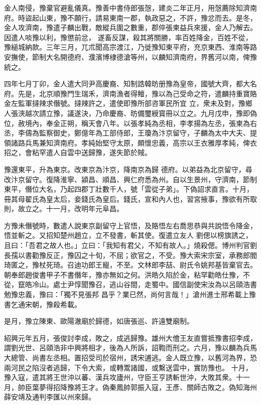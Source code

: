 \begin{pinyinscope}
 金人南侵，豫棄官避亂儀真。豫善中書侍郎張愨，建炎二年正月，用愨薦除知濟南府。時盜起山東，豫不願行，請易東南一郡，執政惡之，不許，豫忿而去。是冬，金人攻濟南，豫遣子麟出戰，敵縱兵圍之數重，郡倅張柬益兵來援，金人乃解去。因遣人啖豫以利，豫懲前忿，
 遂畜反謀，殺其將關勝，率百姓降金，百姓不從，豫縋城納款。三年三月，兀朮聞高宗渡江，乃徙豫知東平府，充京東西、淮南等路安撫使，節制大名開德府、濮濱博棣德滄等州，以麟知濟南府，界舊河以南，俾豫統之。



 四年七月丁卯，金人遣大同尹高慶裔、知制誥韓昉册豫為皇帝，國號大齊，都大名府。先是，北京順豫門生瑞禾，濟南漁者得鳣，豫以為己受命之符，遣麟持重寶賂金左監軍撻辣求僭號。撻辣許之，遣使即豫所部咨軍民所宜
 立，衆未及對，豫鄉人張浹越次請立豫，議遂決，乃命慶裔、昉備璽綬寳冊以立之。九月戊申，豫即偽位，赦境內，奉金正朔，稱天會八年。以張孝純為丞相，李孝揚為左丞，張柬為右丞，李儔為監察御史，鄭億年為工部侍郎，王瓊為汴京留守，子麟為太中大夫、提領諸路兵馬兼知濟南府。孝純始堅守太原，頗懷忠義，高宗以王衣雅厚孝純，俾衣招之，會粘罕遣人自雲中送歸豫，遂失節於賊。



 豫還東平，升為東京。改東京為汴京，降南京為歸
 德府。以弟益為北京留守，尋改汴京留守。復降淮寧、潁昌、順昌、興仁府悉為州。自以生景州，守濟南，節制東平，僭位大名，乃起四郡丁壯數千人，號「雲從子弟」。下偽詔求直言。十月，冊其母翟氏為皇太后，妾錢氏為皇后。錢氏，宣和內人也，習宮掖事，豫欲有所取則，故立之。十一月，改明年元阜昌。



 方豫未僭號時，數遣人說東京副留守上官悟，及賂悟左右喬思恭與共說悟令降金，悟並斬之。又招知楚州趙立，立不發書，斬其使。復遣立友人
 劉偲以榜旗誘之，且曰：「吾君之故人也。」立曰：「我知有君父，不知有故人。」燒殺偲。博州判官劉長孺以書勸豫反正，豫囚之十旬，不屈；欲官之，不受。豫大索宋宗室，承務郎閻琦匿之，豫杖死琦。召迪功郎王寵，不至。文林郎李喆、尉氏令姚邦基皆棄官去。朝奉郎趙俊書甲子不書僭年，豫亦無如之何。洪皓久陷於金，粘罕勸皓仕豫，不從，竄皓冷山。處士尹惇聞豫召，逃山谷間，走蜀中。國信副使宋汝為以呂頤浩書勉豫忠義，豫曰：「獨不見張邦
 昌乎？業已然，尚何言哉！」滄州進士邢希載上豫書乞通宋朝，豫殺希載。



 是月，豫立陳東、歐陽澈廟於歸德，如唐張巡、許遠雙廟制。



 紹興元年五月，張俊討李成，敗之，成逃歸豫。雄州大儈王友直嘗抵豫書招李成，謂劉光世、呂頤浩非中興將相才，後為人所訴，詔鞫而刑之。六月，豫以麟為兵馬大總管、尚書左丞相。置招受司於宿州，誘宋逋逃。金人既立豫，以舊河為界，恐兩河民之陷沒者逃歸，下令大索，或轉鬻諸國，或繫送雲中，實防豫也。
 十月，豫入寇，遣其將王世沖以蕃、漢兵攻廬州，守臣王亨誘斬世沖，大敗其衆。十一月，帥臣葉夢得招降豫將王才。偽秦鳳帥郭振入寇，王彥、關師古敗之。偽知海州薛安靖及通判李匯以州來歸。




\end{pinyinscope}
